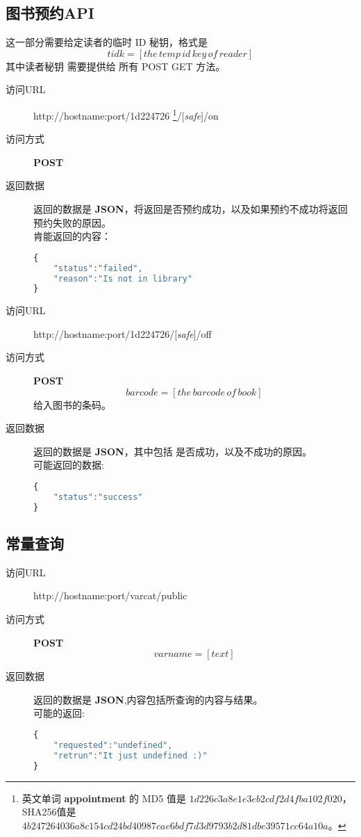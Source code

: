 \documentclass[UTF8]{article}
\def\safe{/[\textit{safe}]}
\def\POST{\colorbox[rgb]{0.77,0.53,0.97}{\textbf{POST}}}
\def\bfJSON{\textbf{JSON}}
\def\viaurl{\item[{\quad\colorbox[rgb]{0.47,0.88,0.89}{访问URL}}]}
\def\viareq#1{\item[{\quad\colorbox[rgb]{0.57,0.88,0.99}{访问方式}}] #1}
\def\rtdata{\item[{\quad\colorbox[rgb]{0.70,0.9,0.59}{返回数据}}]}
\begin{document}
        \subsection{图书预约API}
        这一部分需要给定读者的临时 ID 秘钥，格式是
        $$tidk=[the\,temp\,id\,key\,of\,reader]$$
        其中读者秘钥 需要提供给 所有 POST GET 方法。
        \begin{description}
	         \viaurl http://hostname:port/1d224726
	         \footnote{
	         	英文单词 \textbf{appointment} 的
	         	MD5 值是 $1d226c3a8e1e3eb2cdf2d4fba102f020$，
	         	SHA256值是 $4b247264036a8c154cd24bd40987cae6bdf7d3d9793b2d81dbe39571cc64a10a$。
	         }\safe/on
		     \viareq{\POST}
		     \rtdata 返回的数据是 \bfJSON ，将返回是否预约成功，以及如果预约不成功将返回预约失败的原因。
		     \\ 肯能返回的内容：
			 \begin{lstlisting}[language=JavaScript]
{
	"status":"failed",
	"reason":"Is not in library"
}
			 \end{lstlisting}
	       \end{description}
        \begin{description}
	        \viaurl http://hostname:port/1d224726\safe/off
	        \viareq{\POST}
            $$barcode=[the\, barcode\,of\,book]$$
            给入图书的条码。
	        \rtdata 返回的数据是 \bfJSON ，其中包括 是否成功，以及不成功的原因。
            \\ 可能返回的数据:
            \begin{lstlisting}[language=JavaScript]
{
    "status":"success"
}
            \end{lstlisting}
	         \end{description}
        \subsection{常量查询}
        \begin{description}
	        \viaurl http://hostname:port/varcat/public
	        \viareq{\POST}
	        $$varname=[text]$$
	        \rtdata 返回的数据是 \bfJSON ,内容包括所查询的内容与结果。
	        \\ 可能的返回:
			\begin{lstlisting}[language=JavaScript]
{
	"requested":"undefined",
	"retrun":"It just undefined :)"
}
			\end{lstlisting}
			 \end{description}
\end{document}
